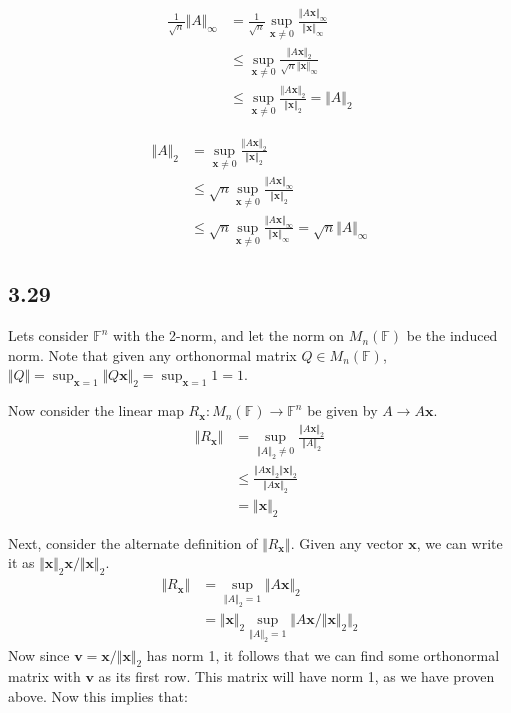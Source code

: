 \documentclass{article}
\begin{document}
	\begin{align*}
	\frac{1}{\sqrt{n}} \Vert A \Vert_{\infty} &= \frac{1}{\sqrt{n}} \sup_{\mathbf{x} \neq 0} \frac{\Vert A \mathbf{x} \Vert_{\infty}}{\Vert \mathbf{x} \Vert_{\infty}} \\
	&\leq \sup_{\mathbf{x} \neq 0} \frac{ \Vert A \mathbf{x} \Vert_2}{\sqrt{n} \Vert \mathbf{x} \Vert_{\infty}} \\
	&\leq \sup_{\mathbf{x} \neq 0} \frac{\Vert A \mathbf{x} \Vert_2}{\Vert \mathbf{x} \Vert_2} = \Vert A \Vert_2
	\end{align*}
	
	\begin{align*}
	\Vert A \Vert_2 &= \sup_{\mathbf{x} \neq 0} \frac{ \Vert A \mathbf{x} \Vert_2}{\Vert \mathbf{x} \Vert_2} \\
	&\leq \sqrt{n} \sup_{\mathbf{x} \neq 0} \frac{ \Vert A \mathbf{x} \Vert_\infty}{\Vert \mathbf{x} \Vert_2} \\
	&\leq \sqrt{n} \sup_{\mathbf{x} \neq 0} \frac{\Vert A \mathbf{x} \Vert_\infty}{\Vert \mathbf{x} \Vert_{\infty}} = \sqrt{n} \Vert A \Vert_{\infty}
	\end{align*}
	
	\subsection*{3.29}
	Lets consider $\mathbb{F}^n$ with the 2-norm, and let the norm on $M_n(\mathbb{F})$ be the induced norm. Note that given any orthonormal matrix $Q \in M_n(\mathbb{F})$, $ \Vert Q \Vert = \sup_{\mathbf{x} = 1} \Vert Q \mathbf{x} \Vert_2 = \sup_{\mathbf{x} = 1} 1 = 1$. 
	
	Now consider the linear map $R_\mathbf{x} : M_n(\mathbb{F}) \to \mathbb{F}^n$ be given by $A \to A \mathbf{x}$. 
	\begin{align*}
	\Vert R_{\mathbf{x}} \Vert &= \sup_{\Vert A \Vert_2 \neq 0} \frac{\Vert A \mathbf{x}\Vert_2 }{\Vert A \Vert_2} \\
	&\leq \frac{\Vert A \mathbf{x} \Vert_2 \Vert \mathbf{x} \Vert_2}{\Vert A \mathbf{x} \Vert_2}\\
	&= \Vert \mathbf{x} \Vert_2
	\end{align*}
	
	Next, consider the alternate definition of $\Vert R_\mathbf{x} \Vert$. Given any vector $\mathbf{x}$, we can write it as $\Vert \mathbf{x} \Vert_2 \mathbf{x} / \Vert \mathbf{x} \Vert_2$. 
	\begin{align*}
	\Vert R_\mathbf{x} \Vert &= \sup_{\Vert A \Vert_2 = 1} \Vert A \mathbf{x} \Vert_2\\
	&= \Vert \mathbf{x} \Vert_2 \sup_{\Vert A \Vert_2 = 1} \Vert A \mathbf{x} / \Vert \mathbf{x} \Vert_2 \Vert_2 
	\end{align*}
	Now since $\mathbf{v} = \mathbf{x} / \Vert \mathbf{x} \Vert_2$ has norm 1, it follows that we can find some orthonormal matrix with $\mathbf{v}$ as its first row. This matrix will have norm 1, as we have proven above. Now this implies that:
	
\end{document}
